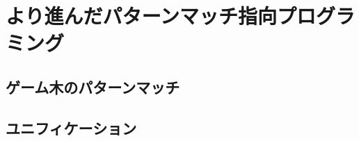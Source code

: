 \chapter{より進んだパターンマッチ指向プログラミング}\label{advanced}

\section{ゲーム木のパターンマッチ}\label{advanced-tree}

\section{ユニフィケーション}\label{advanced-unify}

